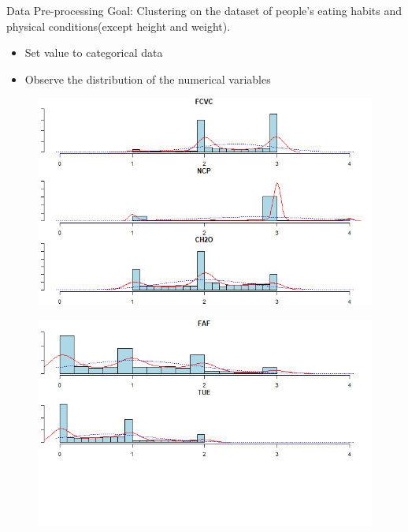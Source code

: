 \documentclass[11pt]{beamer}
\begin{document}
\begin{frame}{Data Pre-processing}
Goal: Clustering on the dataset of people's eating habits and physical conditions(except height and weight).
\begin{itemize}
    \item Set value to categorical data
    \item Observe the distribution of the numerical variables
\end{itemize}

    \begin{figure}[!htb]
   \begin{minipage}{0.48\textwidth}
     \centering
     \includegraphics[width=1\linewidth]{images/skew1.png}
     \label{Fig:skew1}
   \end{minipage}\hfill
   \begin{minipage}{0.48\textwidth}
     \centering
     \includegraphics[width=1\linewidth]{images/skew2.png}
     \label{Fig:skew2}
   \end{minipage}
\end{figure}

\end{frame}
\end{document}
